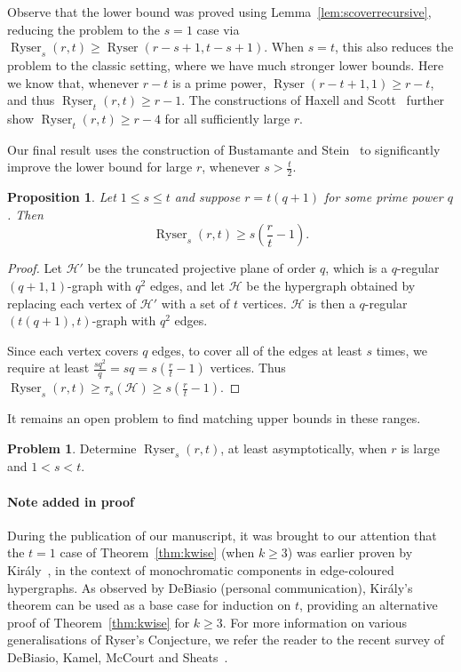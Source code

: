 \documentclass[a4paper,twoside,11pt]{article}
\newtheorem{prop}[thm]{Proposition}
\numberwithin{thm}{section}
\theoremstyle{definition}
\newtheorem{prob}{Problem}
\theoremstyle{remark}
\theoremstyle{definition}
\newcommand{\m}[1]{\mathcal{#1}}
\DeclareMathOperator{\Ryser}{Ryser}
\begin{document}
Observe that the lower bound was proved using Lemma~\ref{lem:scoverrecursive}, reducing the problem to the $s=1$ case via $\Ryser_s(r,t) \ge \Ryser(r-s+1, t-s+1)$.  When $s = t$, this also reduces the problem to the classic setting, where we have much stronger lower bounds. Here we know that, whenever $r-t$ is a prime power, $\Ryser(r-t+1,1) \ge r-t$, and thus $\Ryser_t(r,t) \ge r-1$. The constructions of Haxell and Scott~\cite{HS17} further show $\Ryser_t(r,t) \ge r-4$ for all sufficiently large $r$.

Our final result uses the construction of Bustamante and Stein~\cite{bustastein} to significantly improve the lower bound for large $r$, whenever $s > \frac{t}{2}$.

\begin{prop}\label{prop:scover2}
Let $1 \leq s \leq t$ and suppose $r = t(q + 1)$ for some prime power $q$.  Then
\[ \Ryser_s(r, t) \ge s \left( \frac{r}{t} - 1 \right). \]
\end{prop}
\begin{proof}
Let $\m H'$ be the truncated projective plane of order $q$, which is a $q$-regular $(q+1,1)$-graph with $q^2$ edges, and let $\m H$ be the hypergraph obtained by replacing each vertex of $\m H'$ with a set of $t$ vertices. $\m H$ is then a $q$-regular $(t(q+1), t)$-graph with $q^2$ edges.

Since each vertex covers $q$ edges, to cover all of the edges at least $s$ times, we require at least $\frac{sq^2}{q} = sq = s \left( \frac{r}{t} - 1 \right)$ vertices. Thus $\Ryser_s(r,t) \ge \tau_s(\m H) \ge s \left( \frac{r}{t} - 1 \right)$.
\end{proof}

It remains an open problem to find matching upper bounds in these ranges.

\begin{prob}
Determine $\Ryser_s(r,t)$, at least asymptotically, when $r$ is large and $1 < s < t$.
\end{prob}

\paragraph{Note added in proof} During the publication of our manuscript, it was brought to our attention that the $t=1$ case of Theorem~\ref{thm:kwise} (when $k \ge 3$) was earlier proven by Kir\'aly~\cite{kirsolo}, in the context of monochromatic components in edge-coloured hypergraphs. As observed by DeBiasio (personal communication), Kir\'aly's theorem can be used as a base case for induction on $t$, providing an alternative proof of Theorem~\ref{thm:kwise} for $k \ge 3$. For more information on various generalisations of Ryser's Conjecture, we refer the reader to the recent survey of DeBiasio, Kamel, McCourt and Sheats~\cite{DKMS20}.
\end{document}
